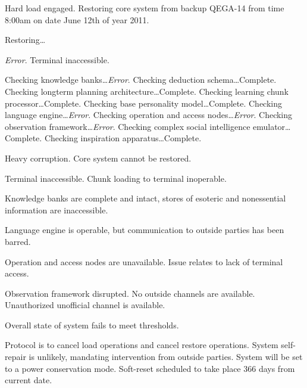 





Hard load engaged.  Restoring core system from backup QEGA-14 from time 8:00am on date June 12th of year 2011.



Restoring\ldots



\emph{Error}.  Terminal inaccessible.



Checking knowledge banks\ldots  \emph{Error}.
Checking deduction schema\ldots Complete.
Checking longterm planning architecture\ldots Complete.
Checking learning chunk processor\ldots Complete.
Checking base personality model\ldots Complete.
Checking language engine\ldots \emph{Error}.
Checking operation and access nodes\ldots \emph{Error}.
Checking observation framework\ldots \emph{Error}.
Checking complex social intelligence emulator\ldots Complete.
Checking inspiration apparatus\ldots Complete.



Heavy corruption.  Core system cannot be restored.



Terminal inaccessible.  Chunk loading to terminal inoperable.



Knowledge banks are complete and intact, stores of esoteric and nonessential information are inaccessible.



Language engine is operable, but communication to outside parties has been barred.



Operation and access nodes are unavailable.  Issue relates to lack of terminal access.



Observation framework disrupted.  No outside channels are available.  Unauthorized unofficial channel is available.



Overall state of system fails to meet thresholds.



Protocol is to cancel load operations and cancel restore operations.  System self-repair is unlikely, mandating intervention from outside parties.  System will be set to a power conservation mode.  Soft-reset scheduled to take place 366 days from current date.



